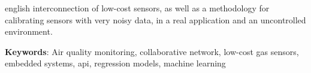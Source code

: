 \begin{resumo}[Abstract]
\begin{otherlanguage*}{english}
interconnection of low-cost sensors, as well as a methodology for calibrating sensors with very noisy data, in a real application and an uncontrolled environment.

		\textbf{Keywords}: Air quality monitoring, collaborative network, low-cost gas sensors, embedded systems, \acrshort{api}, regression models, machine learning
	\end{otherlanguage*}
\end{resumo}

{%
	\hypersetup{hidelinks}
	\listoffigures*
	\cleardoublepage
	
	\listoftables*
	\cleardoublepage
	
	
	\printglossary[title=Lista de Siglas, toctitle=Lista de siglas]

	\tableofcontents*
	\cleardoublepage
	
}%
